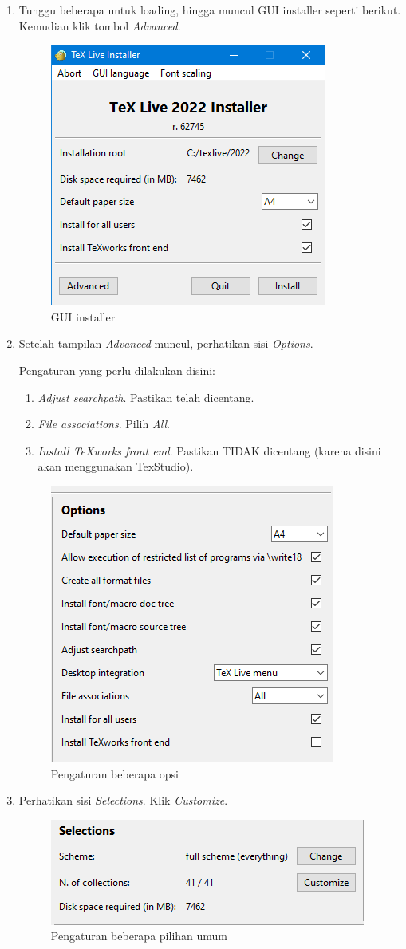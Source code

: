 \documentclass{book} %
\begin{document}
\begin{enumerate}
		\item Tunggu beberapa untuk loading, hingga muncul GUI installer seperti berikut.
		Kemudian klik tombol \textit{Advanced}.

		\begin{figure}[!ht]
			\centering
			\includegraphics[width=0.3\linewidth]{images/texlivewin3}
			\caption{GUI installer}
		\end{figure}

		\item Setelah tampilan \textit{Advanced} muncul, perhatikan sisi \textit{Options}.

		Pengaturan yang perlu dilakukan disini:
		\begin{enumerate}
			\item \textit{Adjust searchpath}. Pastikan telah dicentang.
			\item \textit{File associations}. Pilih \textit{All}.
			\item \textit{Install TeXworks front end}. Pastikan TIDAK dicentang (karena disini akan menggunakan TexStudio).
		\end{enumerate}

		\begin{figure}[!ht]
			\centering
			\includegraphics[width=0.3\linewidth]{images/texlivewin4}
			\caption{Pengaturan beberapa opsi}
		\end{figure}

		\newpage
		\item Perhatikan sisi \textit{Selections}. Klik \textit{Customize}.

		\begin{figure}[!ht]
			\centering
			\includegraphics[width=0.3\linewidth]{images/texlivewin5}
			\caption{Pengaturan beberapa pilihan umum}
		\end{figure}


\end{enumerate}
\end{document}
